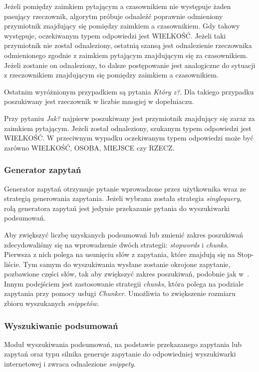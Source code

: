 Jeżeli pomiędzy zaimkiem pytającym a czasownikiem nie występuje żaden pasujący rzeczownik, algorytm próbuje odnaleźć poprawnie odmieniony przymiotnik znajdujący się pomiędzy zaimkiem a czasownikiem. Gdy takowy występuje, oczekiwanym typem odpowiedzi jest WIELKOŚĆ. Jeżeli taki przymiotnik nie został odnaleziony, ostatnią szansą jest odnalezienie rzeczownika odmienionego zgodnie z zaimkiem pytającym znajdującym się za czasownikiem. Jeżeli zostanie on odnaleziony, to dalsze postępowanie jest analogiczne do sytuacji z rzeczownikiem znajdującym się pomiędzy zaimkiem a czasownikiem. 

Ostatnim wyróżnionym przypadkiem są pytania \emph{Który z?}. Dla takiego przypadku poszukiwany jest rzeczownik w liczbie mnogiej w dopełniaczu. 

Przy pytaniu \emph{Jak?} najpierw poszukiwany jest przymiotnik znajdujący się zaraz za zaimkiem pytającym. Jeżeli został odnaleziony, szukanym typem odpowiedzi jest WIELKOŚĆ. W przeciwnym wypadku oczekiwanym typem odpowiedzi może być zarówno WIELKOŚĆ, OSOBA, MIEJSCE czy RZECZ. 

\subsubsection{Generator zapytań}
Generator zapytań otrzymuje pytanie wprowadzone przez użytkownika wraz ze strategią generowania zapytania. Jeżeli wybrana została strategia \emph{singlequery}, rolą generatora zapytań jest jedynie przekazanie pytania do wyszukiwarki podsumowań. 


Aby zwiększyć liczbę uzyskanych podsumowań lub zmienić zakres poszukiwań zdecydowaliśmy się na wprowadzenie dwóch strategii: \emph{stopwords} i \emph{chunks}. Pierwsza z nich polega na usunięciu słów z zapytania, które znajdują się na Stop-liście. Tym samym do wyszukiwania wysłane zostanie okrojone zapytanie, pozbawione części słów, tak aby zwiększyć zakres poszukiwań, podobnie jak w~\cite{brill2002analysis}. Innym podejściem jest zastosowanie strategii \emph{chunks}, która polega na podziale zapytania przy pomocy usługi \emph{Chunker}. Umożliwia to zwiększenie rozmiaru zbioru wyszukanych \emph{snippetów}.

\subsubsection{Wyszukiwanie podsumowań}
Moduł wyszukiwania podsumowań, na podstawie przekazanego zapytania lub zapytań oraz typu silnika generuje zapytanie do odpowiedniej wyszukiwarki internetowej i zwraca odnalezione \emph{snippety}.

